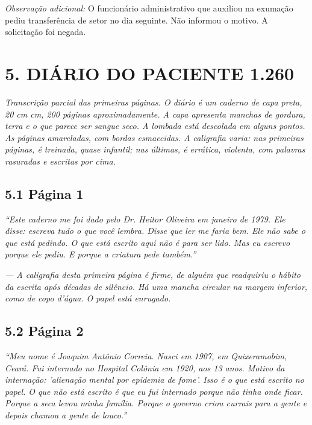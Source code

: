 \textit{Observação adicional:} O funcionário administrativo que auxiliou na exumação pediu transferência de setor no dia seguinte. Não informou o motivo. A solicitação foi negada.

\vspace{1em}
\section*{5. DIÁRIO DO PACIENTE 1.260}

\noindent\textit{Transcrição parcial das primeiras páginas. O diário é um caderno de capa preta, 20 cm  cm, 200 páginas aproximadamente. A capa apresenta manchas de gordura, terra e o que parece ser sangue seco. A lombada está descolada em alguns pontos. As páginas amareladas, com bordas esmaecidas. A caligrafia varia: nas primeiras páginas, é treinada, quase infantil; nas últimas, é errática, violenta, com palavras rasuradas e escritas por cima.}
\vspace{1em}

\subsection*{5.1 Página 1}

\vspace{0.5em}

\noindent\textit{``Este caderno me foi dado pelo Dr. Heitor Oliveira em janeiro de 1979. Ele disse: escreva tudo o que você lembra. Disse que ler me faria bem. Ele não sabe o que está pedindo. O que está escrito aqui não é para ser lido. Mas eu escrevo porque ele pediu. E porque a criatura pede também.''
}

\vspace{0.5em}
\noindent\textit{--- A caligrafia desta primeira página é firme, de alguém que readquiriu o hábito da escrita após décadas de silêncio. Há uma mancha circular na margem inferior, como de copo d'água. O papel está enrugado.}

\vspace{1em}

\subsection*{5.2 Página 2}

\vspace{0.5em}

\noindent\textit{``Meu nome é Joaquim Antônio Correia. Nasci em 1907, em Quixeramobim, Ceará. Fui internado no Hospital Colônia em 1920, aos 13 anos. Motivo da internação: 'alienação mental por epidemia de fome'. Isso é o que está escrito no papel. O que não está escrito é que eu fui internado porque não tinha onde ficar. Porque a seca levou minha família. Porque o governo criou currais para a gente e depois chamou a gente de louco.''
}

